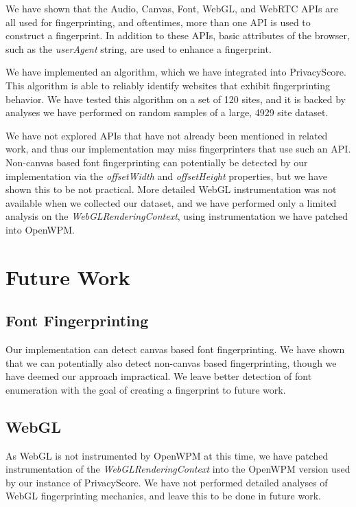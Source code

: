 \documentclass[
    fontsize=12pt,
    headings=small,
    parskip=half,
    bibliography=totoc,
    numbers=noenddot,
    open=any
    ]{scrreprt}
\begin{document}
We have shown that the Audio, Canvas, Font, WebGL, and WebRTC APIs are all used
for fingerprinting, and oftentimes, more than one API is used to construct a fingerprint.
In addition to these APIs, basic attributes of the browser, such as the \textit{userAgent}
string, are used to enhance a fingerprint.

We have implemented an algorithm, which we have integrated into PrivacyScore. This algorithm
is able to reliably identify websites that exhibit fingerprinting behavior.
We have tested this algorithm on a set of 120 sites, and it is backed by analyses we have performed
on random samples of a large, 4929 site dataset.

We have not explored APIs that have not already been mentioned in related work, and thus
our implementation may miss fingerprinters that use such an API.
Non-canvas based font fingerprinting can potentially be detected by our implementation
via the \textit{offsetWidth} and \textit{offsetHeight} properties, but we have shown
this to be not practical.
More detailed WebGL instrumentation was not available when we collected our dataset,
and we have performed only a limited analysis on the \textit{WebGLRenderingContext},
using instrumentation we have patched into OpenWPM.

\section{Future Work}
\subsection{Font Fingerprinting}
Our implementation can detect canvas based font fingerprinting. We have shown that we can
potentially also detect non-canvas based fingerprinting, though we have deemed our approach
impractical. We leave better detection of font enumeration with the goal of creating a fingerprint
to future work.

\subsection{WebGL}
As WebGL is not instrumented by OpenWPM at this time, we have patched instrumentation
of the \textit{WebGLRenderingContext} into the OpenWPM version used by
our instance of PrivacyScore. We have not performed detailed analyses of WebGL fingerprinting
mechanics, and leave this to be done in future work.
\end{document}
